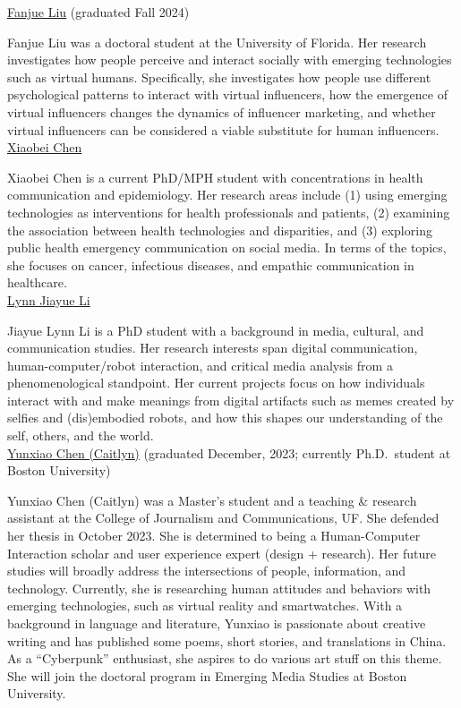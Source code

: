 \documentclass[]{article}
\begin{document}
\href{https://www.fanjueliu.com/}{Fanjue Liu} (graduated Fall 2024)

Fanjue Liu was a doctoral student at the University of Florida. Her
research investigates how people perceive and interact socially with
emerging technologies such as virtual humans. Specifically, she
investigates how people use different psychological patterns to interact
with virtual influencers, how the emergence of virtual influencers
changes the dynamics of influencer marketing, and whether virtual
influencers can be considered a viable substitute for human
influencers.\\

\href{https://www.linkedin.com/in/xiaobei-chen/}{Xiaobei Chen}

Xiaobei Chen is a current PhD/MPH student with concentrations in health
communication and epidemiology. Her research areas include (1) using
emerging technologies as interventions for health professionals and
patients, (2) examining the association between health technologies and
disparities, and (3) exploring public health emergency communication on
social media. In terms of the topics, she focuses on cancer, infectious
diseases, and empathic communication in healthcare.\\

 \href{https://www.jou.ufl.edu/staff/jiayue-lynn-li/}{Lynn Jiayue Li}

Jiayue Lynn Li is a PhD student with a background in media, cultural,
and communication studies. Her research interests span digital
communication, human-computer/robot interaction, and critical media
analysis from a phenomenological standpoint. Her current projects focus
on how individuals interact with and make meanings from digital
artifacts such as memes created by selfies and (dis)embodied robots, and
how this shapes our understanding of the self, others, and the world.\\

\href{https://www.linkedin.com/in/yunxiao-caitlyn-chen-133413178/}{Yunxiao
Chen (Caitlyn)} (graduated December, 2023; currently Ph.D.~student at
Boston University)

Yunxiao Chen (Caitlyn) was a Master's student and a teaching \& research
assistant at the College of Journalism and Communications, UF. She
defended her thesis in October 2023. She is determined to being a
Human-Computer Interaction scholar and user experience expert (design +
research). Her future studies will broadly address the intersections of
people, information, and technology. Currently, she is researching human
attitudes and behaviors with emerging technologies, such as virtual
reality and smartwatches. With a background in language and literature,
Yunxiao is passionate about creative writing and has published some
poems, short stories, and translations in China. As a ``Cyberpunk''
enthusiast, she aspires to do various art stuff on this theme. She will
join the doctoral program in Emerging Media Studies at Boston
University.\\
\end{document}
